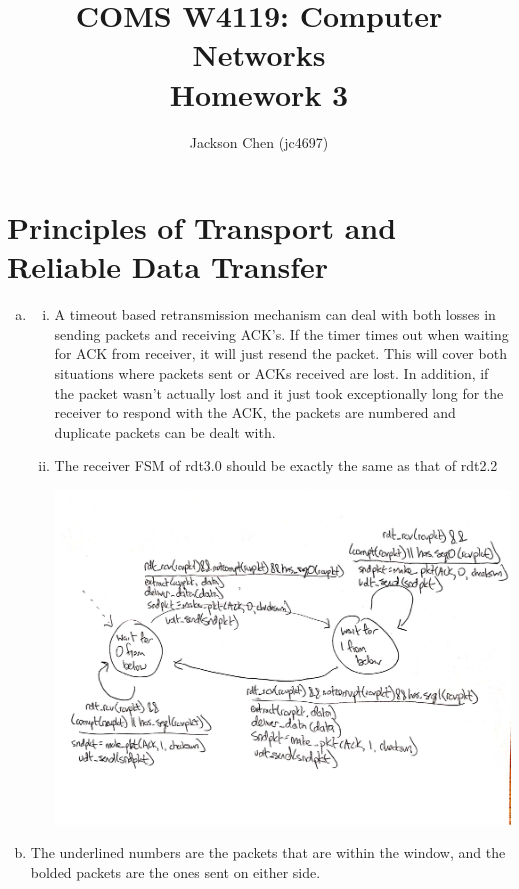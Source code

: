 \documentclass[11pt]{article}
\begin{document}

\title{COMS W4119: Computer Networks\\
       Homework 3}
\author{Jackson Chen (jc4697)} %
\maketitle

\section*{Principles of Transport and Reliable Data Transfer}
  \begin{enumerate}[(a)]
    \item
      \begin{enumerate}[(i)]
        \item A timeout based retransmission mechanism can deal with both losses in
          sending packets and receiving ACK's. If the timer times out when waiting for ACK
          from receiver, it will just resend the packet. This will cover both situations
          where packets sent or ACKs received are lost. In addition, if the packet wasn't
          actually lost and it just took exceptionally long for the receiver to respond with
          the ACK, the packets are numbered and duplicate packets can be dealt with.
        \item
          The receiver FSM of rdt3.0 should be exactly the same as that of rdt2.2

          \includegraphics[width=15cm]{q1pa}
      \end{enumerate}
    \item
      The underlined numbers are the packets that are within the window, and the
      bolded packets are the ones sent on either side.


\end{enumerate}
\end{document}
